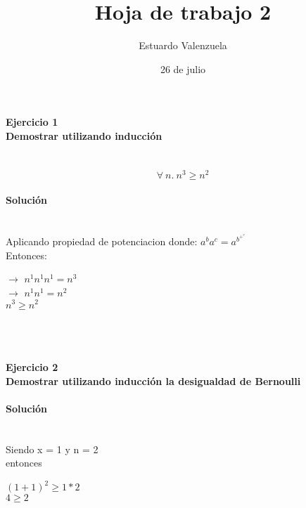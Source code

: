 \documentclass{article}
\begin{document}
\title{Hoja de trabajo 2}
\author{Estuardo Valenzuela}
\date{26 de julio}
\maketitle
\paragraph{Ejercicio 1 \ \\ Demostrar utilizando inducci\'on}
\ \\ \[
\forall\ n.\ n^3\geq n^2
 \]
\paragraph{Soluci\'on}
\ \\ 
Aplicando propiedad de potenciacion donde:
 $a^ba^c=a^b^+^c$
\ \\
Entonces:
\begin{center}
$\rightarrow$ $n^1n^1n^1 = n^3$
\ \\ $\rightarrow$ $n^1n^1 = n^2$
\ \\ $n^3\geq n^2$
\end{center} 
\ \\
\ \\ \paragraph{Ejercicio 2 \ \\ Demostrar utilizando inducci\'on la desigualdad de Bernoulli}
\paragraph{Soluci\'on}
\ \\ Siendo x = 1 y n = 2
\ \\ entonces
\begin{center}
	$(1+1)^2 \geq 1*2$
	\ \\ $4 \geq 2$
\end{center}
\end{document}
